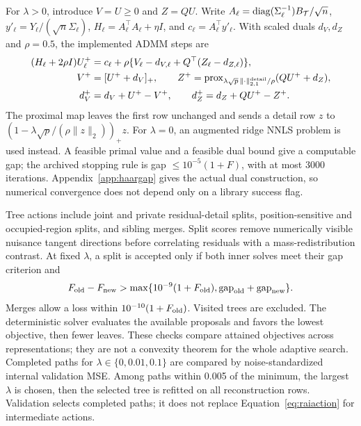 For $\lambda>0$, introduce $V=U\geq0$ and $Z=QU$. Write $A_\ell=\operatorname{diag}(\Sigma_\ell^{-1})B_{\mathcal T}/\sqrt n$, $y'_\ell=Y_\ell/(\sqrt n\Sigma_\ell)$, $H_\ell=A_\ell^\top A_\ell+\eta I$, and $c_\ell=A_\ell^\top y'_\ell$. With scaled duals $d_V,d_Z$ and $\rho=0.5$, the implemented ADMM steps are
\begin{align}
 (H_\ell+2\rho I)U_\ell^+&=c_\ell+\rho\{V_\ell-d_{V,\ell}+Q^\top(Z_\ell-d_{Z,\ell})\},\label{eq:raiadmm}\\
 V^+&=[U^++d_V]_+,\qquad Z^+=\operatorname{prox}_{\lambda\sqrt p\,\|\cdot\|_{2,1}^{\rm detail}/\rho}(QU^++d_Z),\nonumber\\
 d_V^+&=d_V+U^+-V^+,\qquad d_Z^+=d_Z+QU^+-Z^+.\nonumber
\end{align}
The proximal map leaves the first row unchanged and sends a detail row $z$ to $(1-\lambda\sqrt p/(\rho\|z\|_2))_+z$. For $\lambda=0$, an augmented ridge NNLS problem is used instead. A feasible primal value and a feasible dual bound give a computable gap; the archived stopping rule is gap $\leq10^{-5}(1+F)$, with at most 3000 iterations. Appendix~\ref{app:haargap} gives the actual dual construction, so numerical convergence does not depend only on a library success flag.

Tree actions include joint and private residual-detail splits, position-sensitive and occupied-region splits, and sibling merges. Split scores remove numerically visible nuisance tangent directions before correlating residuals with a mass-redistribution contrast. At fixed $\lambda$, a split is accepted only if both inner solves meet their gap criterion and
\begin{equation}\label{eq:raiaction}
 F_{\rm old}-F_{\rm new}>\max\{10^{-9}(1+F_{\rm old}),\mathrm{gap}_{\rm old}+\mathrm{gap}_{\rm new}\}.
\end{equation}
Merges allow a loss within $10^{-10}(1+F_{\rm old})$. Visited trees are excluded. The deterministic solver evaluates the available proposals and favors the lowest objective, then fewer leaves. These checks compare attained objectives across representations; they are not a convexity theorem for the whole adaptive search. Completed paths for $\lambda\in\{0,0.01,0.1\}$ are compared by noise-standardized internal validation MSE. Among paths within 0.005 of the minimum, the largest $\lambda$ is chosen, then the selected tree is refitted on all reconstruction rows. Validation selects completed paths; it does not replace Equation~\eqref{eq:raiaction} for intermediate actions.

